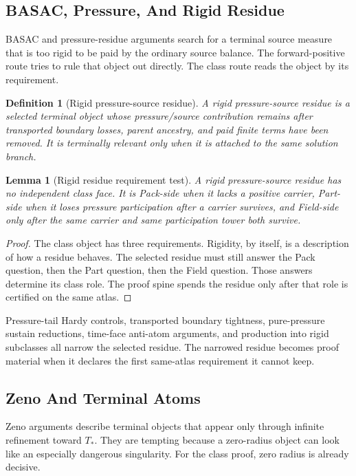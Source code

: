 \documentclass[11pt]{article}
\newtheorem{lemma}{Lemma}
\newtheorem{definition}{Definition}
\begin{document}
\subsection{BASAC, Pressure, And Rigid Residue}

BASAC and pressure-residue arguments search for a terminal source measure that is too rigid to be paid by the ordinary source balance.
The forward-positive route tries to rule that object out directly.
The class route reads the object by its requirement.

\begin{definition}[Rigid pressure-source residue]
A rigid pressure-source residue is a selected terminal object whose pressure/source contribution remains after transported boundary losses, parent ancestry, and paid finite terms have been removed.
It is terminally relevant only when it is attached to the same solution branch.
\end{definition}

\begin{lemma}[Rigid residue requirement test]
A rigid pressure-source residue has no independent class face.
It is Pack-side when it lacks a positive carrier, Part-side when it loses pressure participation after a carrier survives, and Field-side only after the same carrier and same participation tower both survive.
\end{lemma}

\begin{proof}
The class object has three requirements.
Rigidity, by itself, is a description of how a residue behaves.
The selected residue must still answer the Pack question, then the Part question, then the Field question.
Those answers determine its class role.
The proof spine spends the residue only after that role is certified on the same atlas.
\end{proof}

Pressure-tail Hardy controls, transported boundary tightness, pure-pressure sustain reductions, time-face anti-atom arguments, and production into rigid subclasses all narrow the selected residue.
The narrowed residue becomes proof material when it declares the first same-atlas requirement it cannot keep.

\subsection{Zeno And Terminal Atoms}

Zeno arguments describe terminal objects that appear only through infinite refinement toward \(T_*\).
They are tempting because a zero-radius object can look like an especially dangerous singularity.
For the class proof, zero radius is already decisive.
\end{document}
